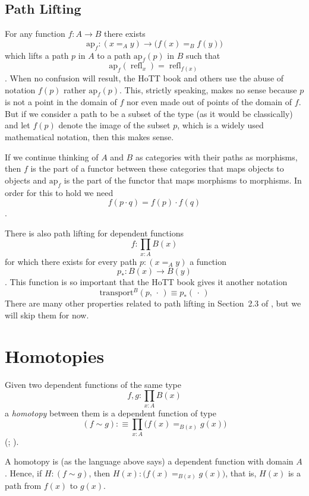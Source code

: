 \documentclass[11pt]{article}
\newcommand{\fatdot}{\,\cdot\,}
\DeclareMathOperator{\refl}{refl}
\begin{document}
\subsection{Path Lifting}

For any function $f : A \to B$ there exists
$$
   \text{ap}_f : (x =_A y) \to \bigl(f(x) =_B f(y)\bigr)
$$
which lifts a path $p$ in $A$ to a path $\text{ap}_f(p)$ in $B$
such that
$$
   \text{ap}_f(\refl_x) = \refl_{f(x)}
$$
.
When no confusion will result, the HoTT book and others use the
abuse of notation $f(p)$ rather $\text{ap}_f(p)$.
This, strictly speaking, makes no sense because $p$ is not a point in the
domain of $f$ nor even made out of points of the domain of $f$.
But if we consider a path to be a subset of the type
(as it would be classically)
and let $f(p)$ denote the image of the subset $p$,
which is a widely used mathematical notation, then this makes sense.

If we continue thinking of $A$ and $B$ as categories with their paths as
morphisms, then $f$ is the part of a functor between these categories
that maps objects to objects and $\text{ap}_f$ is the part of the functor
that maps morphisms to morphisms.  In order for this to hold we need
$$
   f(p \cdot q) = f(p) \cdot f(q)
$$
.

There is also path lifting for dependent functions
$$
   f : \prod_{x : A} B(x)
$$
for which there exists for every path $p : (x =_A y)$ a function
$$
   p_{\textstyle *} : B(x) \to B(y)
$$
.
This function is so important that the HoTT book gives it another
notation
$$
   \text{transport}^B(p, \fatdot) \equiv p_{\textstyle *}(\fatdot)
$$
There are many other properties related to path lifting in
Section~2.3 of , but we will skip them for now.

\section{Homotopies}

Given two dependent functions of the same type
$$
   f, g : \prod_{x : A} B(x)
$$
a \emph{homotopy} between them is a dependent function of type
$$
   (f \sim g) :\equiv \prod_{x : A} \bigl(f(x) =_{B(x)} g(x)\bigr)
$$
(;
\citealp[Definition~9.1.2]{rijke}).

A homotopy is (as the language above says) a dependent function
with domain $A$.  Hence, if $H : (f \sim g)$,
then $H(x) : \bigl(f(x) =_{B(x)} g(x)\bigr)$,
that is, $H(x)$ is a path from $f(x)$ to $g(x)$.
\end{document}
